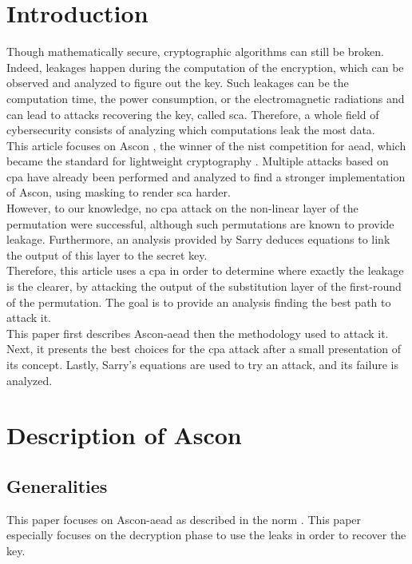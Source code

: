 \documentclass[11pt,technote]{IEEEtran}
\begin{document}
		\section{Introduction}
		Though mathematically secure, cryptographic algorithms can still be broken. Indeed, leakages happen during the computation of the encryption, which can be observed and analyzed to figure out the key. Such leakages can be the computation time, the power consumption, or the electromagnetic radiations and can lead to attacks recovering the key, called \ac{sca}. Therefore, a whole field of cybersecurity consists of analyzing which computations leak the most data.\\
		This article focuses on Ascon \cite{ascon}, the winner of the \ac{nist} competition for \ac{aead}, which became the standard for lightweight cryptography \cite{norme}. Multiple attacks \cite{cpa_lin,dl_cpa} based on \ac{cpa} \cite{cpa_aes} have already been performed and analyzed \cite{cpa_analysis} to find a stronger implementation of Ascon, using masking to render \ac{sca} harder.\\
		However, to our knowledge, no \ac{cpa} attack on the non-linear layer of the permutation were successful, although such permutations are known to provide leakage. Furthermore, an analysis provided by Sarry\cite{these} deduces equations to link the output of this layer to the secret key.\\
		Therefore, this article uses a \ac{cpa} in order to determine where exactly the leakage is the clearer, by attacking the output of the substitution layer of the first-round of the permutation. The goal is to provide an analysis finding the best path to attack it.\\
		This paper first describes Ascon-\ac{aead} then the methodology used to attack it. Next, it presents the best choices for the \ac{cpa} attack after a small presentation of its concept. Lastly, Sarry's equations \cite{these} are used to try an attack, and its failure is analyzed.
		
		\section{Description of Ascon}
		\subsection{Generalities}
		This paper focuses on Ascon-\ac{aead} as described in the norm \cite{norme}. This paper especially focuses on the decryption phase to use the leaks in order to recover the key.
		
\end{document}
